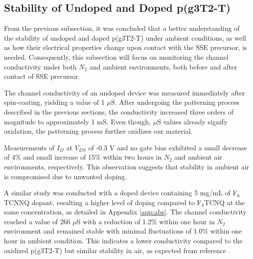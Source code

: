 \subsection{Stability of Undoped and Doped p(g3T2-T)} \label{subsec:stab}
From the previous subsection, it was concluded that a better understanding of the stability of undoped and doped p(g3T2-T) under ambient conditions, as well as how their electrical properties change upon contact with the SSE precursor, is needed. Consequently, this subsection will focus on monitoring the channel conductivity under both $N_{2}$ and ambient environments, both before and after contact of SSE precursor.

The channel conductivity of an undoped device was measured immediately after spin-coating, yielding a value of 1 $\mu$S. After undergoing the patterning process described in the previous sections, the conductivity increased three orders of magnitude to approximately 1 mS. Even though, $\mu$S values already signify oxidation, the patterning process further oxidizes our material. %

Measurements of $I_{D}$ at $V_{DS}$ of -0.3 V and no gate bias exhibited a small decrease of 4\% and small increase of 15\% within two hours in $N_{2}$ and ambient air environments, respectively. This observation suggests that stability in ambient air is compromised due to unwanted doping.

A similar study was conducted with a doped device containing 5 mg/mL of F$_{6}$TCNNQ dopant, resulting a higher level of doping compared to F$_{4}$TCNQ at the same concentration, as detailed in Appendix \ref{app:abs}. The channel conductivity reached a value of 266 $\mu$S with a reduction of 1.2\% within one hour in $N_{2}$ environment and remained stable with minimal fluctuations of 1.0\% within one hour in ambient condition. This indicates a lower conductivity compared to the oxidized p(g3T2-T) but similar stability in air, as expected from reference \cite{tanTuningOrganicElectrochemical2022}.

